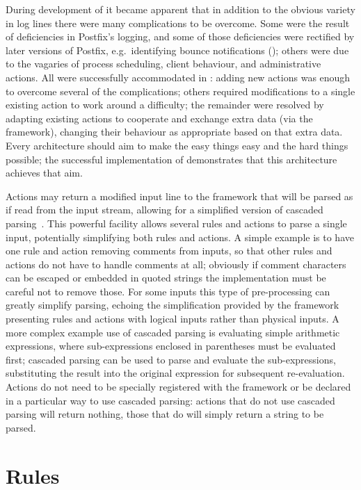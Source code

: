 During development of \parsername{} it became apparent that in addition to
the obvious variety in log lines there were many complications to be
overcome.  Some were the result of deficiencies in Postfix's logging, and
some of those deficiencies were rectified by later versions of Postfix,
e.g.\ identifying bounce notifications (); others were due to the vagaries of process scheduling,
client behaviour, and administrative actions.  All were successfully
accommodated in \parsername{}: adding new actions was enough to overcome
several of the complications; others required modifications to a single
existing action to work around a difficulty; the remainder were resolved by
adapting existing actions to cooperate and exchange extra data (via the
framework), changing their behaviour as appropriate based on that extra
data.  Every architecture should aim to make the easy things easy and the
hard things possible; the successful implementation of \parsername{}
demonstrates that this architecture achieves that aim.

Actions may return a modified input line to the framework that will be
parsed as if read from the input stream, allowing for a simplified version
of cascaded parsing~\cite{cascaded-parsing}.  This powerful facility allows
several rules and actions to parse a single input, potentially simplifying
both rules and actions.  A simple example is to have one rule and action
removing comments from inputs, so that other rules and actions do not
have to handle comments at all; obviously if comment characters can be
escaped or embedded in quoted strings the implementation must be careful
not to remove those.  For some inputs this type of pre-processing can
greatly simplify parsing, echoing the simplification provided by the
framework presenting rules and actions with logical inputs rather than
physical inputs.  A more complex example use of cascaded parsing is
evaluating simple arithmetic expressions, where sub-expressions enclosed in
parentheses must be evaluated first; cascaded parsing can be used to parse
and evaluate the sub-expressions, substituting the result into the original
expression for subsequent re-evaluation.  Actions do not need to be
specially registered with the framework or be declared in a particular way
to use cascaded parsing: actions that do not use cascaded parsing will
return nothing, those that do will simply return a string to be parsed.

\section{Rules}

